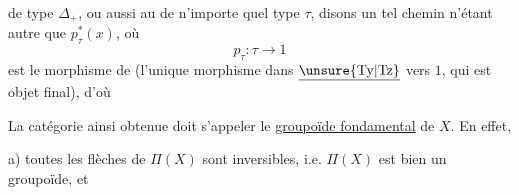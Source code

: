 de type $\Delta_+$, ou aussi au  de n'importe quel type $\tau$, disons
un tel chemin n'étant autre que $p_\tau^*(x)$, où
\[p_\tau:\tau\longrightarrow 1\]
est le morphisme de  (l'unique morphisme dans $\underline{\unsure{\mathrm{Ty}|\mathrm{Tz}}}$ vers $1$, qui est objet final),
d'où

La catégorie  ainsi obtenue doit s'appeler le \uline{groupoïde fondamental} de $X$. En effet, 

a) toutes les flèches de $\Pi(X)$ sont inversibles, i.e. $\Pi(X)$ est bien un groupoïde, et

